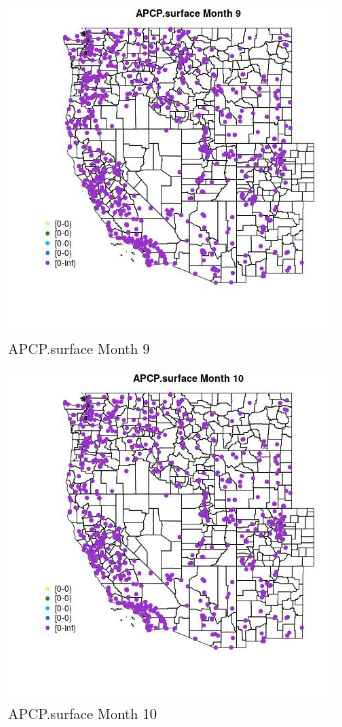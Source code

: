 \begin{figure} 
\centering  
\includegraphics[width=0.77\textwidth]{Code_Outputs/Report_ML_input_PM25_Step4_part_e_de_duplicated_aves_compiled_2019-05-21wNAs_MapObsMo9APCPsurface.jpg} 
\caption{\label{fig:Report_ML_input_PM25_Step4_part_e_de_duplicated_aves_compiled_2019-05-21wNAsMapObsMo9APCPsurface}APCP.surface Month 9} 
\end{figure} 
 

\begin{figure} 
\centering  
\includegraphics[width=0.77\textwidth]{Code_Outputs/Report_ML_input_PM25_Step4_part_e_de_duplicated_aves_compiled_2019-05-21wNAs_MapObsMo10APCPsurface.jpg} 
\caption{\label{fig:Report_ML_input_PM25_Step4_part_e_de_duplicated_aves_compiled_2019-05-21wNAsMapObsMo10APCPsurface}APCP.surface Month 10} 
\end{figure} 
 

